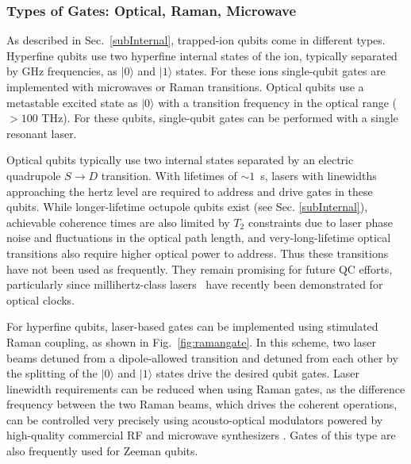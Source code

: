 \documentclass[%
reprint,
 amsmath,amssymb,
]{revtex4-1}
\newcommand{\zero}{|0 \rangle}
\newcommand{\one}{|1 \rangle}
\begin{document}
    \subsubsection{Types of Gates: Optical, Raman, Microwave}
\label{Gatetypes}
As described in Sec.~\ref{subInternal}, trapped-ion qubits come in different types. Hyperfine qubits use two hyperfine internal states of the ion, typically separated by GHz frequencies, as $\zero$ and $\one$ states. For these ions single-qubit gates are implemented with microwaves or Raman transitions. Optical qubits use a metastable excited state as $\zero$ with a transition frequency in the optical range ($> 100$ THz). For these qubits, single-qubit gates can be performed with a single resonant laser.

Optical qubits typically use two internal states separated by an electric quadrupole $S \rightarrow D$ transition. With lifetimes of ${\sim}1$~s, lasers with linewidths approaching the hertz level are required to address and drive gates in these qubits. While longer-lifetime octupole qubits exist (see Sec. \ref{subInternal}), achievable coherence times are also limited by $T_2$ constraints due to laser phase noise and fluctuations in the optical path length, and very-long-lifetime optical transitions also require higher optical power to address. Thus these transitions have not been used as frequently. They remain promising for future QC efforts, particularly since millihertz-class lasers~\cite{Kessler2012} have recently been demonstrated for optical clocks.


For hyperfine qubits, laser-based gates can be implemented using stimulated Raman coupling, as shown in Fig.~\ref{fig:ramangate}. In this scheme, two laser beams detuned from a dipole-allowed transition and detuned from each other by the splitting of the $|0\rangle$ and  $|1\rangle$ states drive the desired qubit gates. Laser linewidth requirements can be reduced when using Raman gates, as the difference frequency between the two Raman beams, which drives the coherent operations, can be controlled very precisely using acousto-optical modulators powered by high-quality commercial RF and microwave synthesizers \cite{leibfried2003quantum}. Gates of this type are also frequently used for Zeeman qubits.
\end{document}
